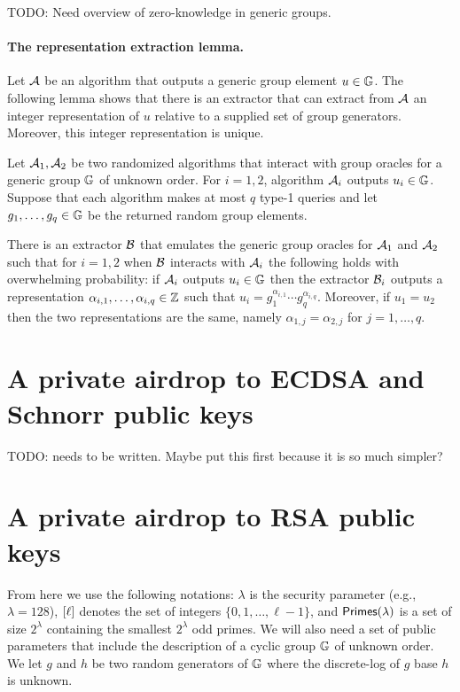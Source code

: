 \documentclass[11pt]{article}
\begin{document}
TODO: Need overview of zero-knowledge in generic groups. 

\paragraph{The representation extraction lemma.}
Let $\mathcal{A}$ be an algorithm that outputs 
a generic group element $u \in \mathbb G$.
The following lemma shows that there is an extractor that
can extract from $\mathcal{A}$ an integer representation of $u$
relative to a supplied set of group generators.
Moreover, this integer representation is unique.

\begin{lemma}
\label{lem:unique}
Let $\mathcal{A}_1, \mathcal{A}_2$ be two randomized algorithms that interact
with group oracles for a generic group $\mathbb G$ of unknown order.
For $i=1,2$, algorithm $\mathcal{A}_i$ outputs $u_i \in \mathbb G$.
Suppose that each algorithm makes at most $q$ type-1 queries
and let $g_1,\ldots,g_q \in \mathbb G$ be the returned random group elements. 

There is an extractor $\mathcal{B}$ that emulates 
the generic group oracles for $\mathcal{A}_1$ and $\mathcal{A}_2$
such that for $i=1,2$ when $\mathcal{B}$ interacts with $\mathcal{A}_i$ 
the following holds with overwhelming probability:
if $\mathcal{A}_i$ outputs $u_i \in \mathbb G$ 
then the extractor $\mathcal{B}_i$ outputs a representation
$\alpha_{i,1},\ldots,\alpha_{i,q} \in \mathbb Z$
such that $u_i = g_1^{\alpha_{i,1}} \cdots g_q^{\alpha_{i,q}}$.
Moreover, if $u_1 = u_2$ then the two representations are the same,
namely $\alpha_{1,j} = \alpha_{2,j}$ for $j=1,\ldots,q$. 
\end{lemma}


\section{A private airdrop to ECDSA and Schnorr public keys}

TODO: needs to be written.  Maybe put this first because it is so much
simpler?



\section{A private airdrop to RSA public keys}

From here we use the following notations:
$\lambda$ is the security parameter (e.g., $\lambda = 128$), 
$[{\ell}]$ denotes the set of integers $\{0,1,\ldots,\ell-1\}$, and 
$\textsf{Primes}(\lambda)$ is a set of size $2^\lambda$ 
containing the smallest $2^\lambda$ odd primes. 
%
We will also need a set of public parameters that include the description
of a cyclic group $\mathbb G$ of unknown order.  We let $g$ and $h$ be two
random generators of $\mathbb G$ where the discrete-log of $g$ base $h$ is unknown. 
\end{document}
